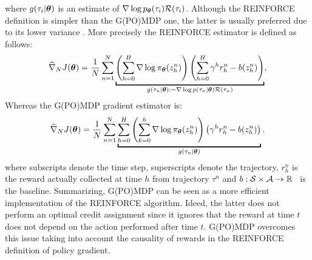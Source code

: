 where $g(\tau_i|\boldsymbol{\theta})$ is an estimate of $\nabla\log p_{\boldsymbol{\theta}}(\tau_i)\mathcal{R}(\tau_i)$.
Although the REINFORCE definition is simpler than the G(PO)MDP one, the latter is usually preferred due to its lower variance \citep{zhao2011analysis}. More precisely the REINFORCE estimator is defined as follows:
\begin{align*}
\gradApp{\vtheta}{N} = \frac{1}{N}\sum_{n=1}^{N}
\underbracket{
	\left(\sum_{h=0}^{H}\nabla \log \pol(z_h^n) \right)\left(\sum_{h=0}^{H}\gamma^h 
	r_h^n
	- b(z_h^n)\right)
}_{g(\tau_n|\vtheta):=\nabla \log p(\tau_n|\vtheta)\Reward(\tau_n)}
,
\end{align*}
Whereas the G(PO)MDP gradient estimator is:
\begin{align*}
\gradApp{\vtheta}{N} = \frac{1}{N}\sum_{n=1}^{N}
\underbracket{
	\sum_{h=0}^{H}\left(\sum_{k=0}^{h} \nabla \log \pol (z_h^n) \right)\left(\gamma^h 
	r_h^n
	- b(z^n_h)\right)
}_{g(\tau_n|\vtheta)}.
\end{align*}
where subscripts denote the time step, superscripts denote the trajectory, $r_h^n$ is the reward actually collected at time $h$ from trajectory $\tau^n$ and $b : \mathcal{S}\times\mathcal{A} \to \mathbb R$~\citep[\eg][]{Thomas2017actionbaseline} is the baseline.
Summarizing, G(PO)MDP can be seen as a more efficient implementation of the REINFORCE algorithm. 
Ideed, the latter does not perform an optimal credit assignment since it ignores that the reward at time $t$ does not depend on the action performed after time $t$.
G(PO)MDP overcomes this issue taking into account the causality of rewards in the REINFORCE definition of policy gradient.


